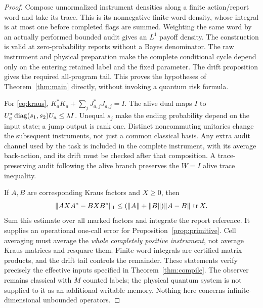 \begin{proof}
Compose unnormalized instrument densities along a finite action/report word and take its trace. This is its nonnegative finite-word density, whose integral is at most one before completed flags are summed. Weighting the same word by an actually performed bounded audit gives an $L^1$ payoff density. The construction is valid at zero-probability reports without a Bayes denominator. The raw instrument and physical preparation make the complete conditional cycle depend only on the entering retained label and the fixed parameter. The drift proposition gives the required all-program tail. This proves the hypotheses of Theorem~\ref{thm:main} directly, without invoking a quantum risk formula.

For \eqref{eq:kraus},
$K_a^*K_a+\sum_jJ_{a,j}^*J_{a,j}=I$.
The alive dual maps $I$ to $U_a^*\operatorname{diag}(s_1,s_2)U_a\le\lambda I$. Unequal $s_j$ make the ending probability depend on the input state; a jump output is rank one. Distinct noncommuting unitaries change the subsequent instruments, not just a common classical basis. Any extra audit channel used by the task is included in the complete instrument, with its average back-action, and its drift must be checked after that composition. A trace-preserving audit following the alive branch preserves the $W=I$ alive trace inequality.

If $A,B$ are corresponding Kraus factors and $X\ge0$, then
\[
 \lVert AXA^*-BXB^*\rVert_1
 \le(\lVert A\rVert+\lVert B\rVert)\lVert A-B\rVert\,\operatorname{tr} X.
\]
Sum this estimate over all marked factors and integrate the report reference. It supplies an operational one-call error for Proposition~\ref{prop:primitive}. Cell averaging must average the \emph{whole completely positive instrument}, not average Kraus matrices and resquare them. Finite-word integrals are certified matrix products, and the drift tail controls the remainder. These statements verify precisely the effective inputs specified in Theorem~\ref{thm:compile}. The observer remains classical with $M$ counted labels; the physical quantum system is not supplied to it as an additional writable memory. Nothing here concerns infinite-dimensional unbounded operators.
\end{proof}

